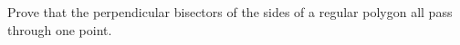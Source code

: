 Prove that the perpendicular bisectors of the sides of a regular polygon all pass through one point.
